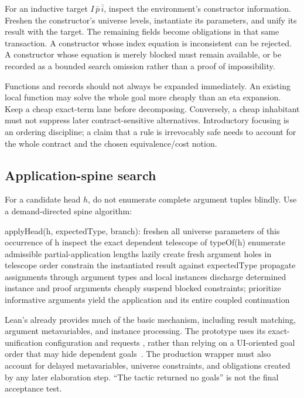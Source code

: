 For an inductive target $I\,\bar p\,\bar i$, inspect the environment's constructor
information. Freshen the constructor's universe levels, instantiate its
parameters, and unify its result with the target. The remaining fields become
obligations in that same transaction. A constructor whose index equation is
inconsistent can be rejected. A constructor whose equation is merely blocked
must remain available, or be recorded as a bounded search omission rather than
a proof of impossibility.

Functions and records should not always be expanded immediately. An existing
local function may solve the whole goal more cheaply than an eta expansion.
Keep a cheap exact-term lane before decomposing. Conversely, a cheap inhabitant
must not suppress later contract-sensitive alternatives. Introductory focusing
is an ordering discipline; a claim that a rule is irrevocably safe needs to
account for the whole contract and the chosen equivalence/cost notion.

\subsection{Application-spine search}\label{sec:spines}

For a candidate head $h$, do not enumerate complete argument tuples blindly.
Use a demand-directed spine algorithm:
\begin{Code}
applyHead(h, expectedType, branch):
  freshen all universe parameters of this occurrence of h
  inspect the exact dependent telescope of typeOf(h)
  enumerate admissible partial-application lengths lazily
  create fresh argument holes in telescope order
  constrain the instantiated result against expectedType
  propagate assignments through argument types and local instances
  discharge determined instance and proof arguments cheaply
  suspend blocked constraints; prioritize informative arguments
  yield the application and its entire coupled continuation
\end{Code}

Lean's  already provides much of the basic mechanism,
including result matching, argument metavariables, and instance processing.
The prototype uses its exact-unification configuration and requests
, rather than relying on a UI-oriented goal order that
may hide dependent goals~\cite{lean-apply}. The production wrapper must also
account for delayed metavariables, universe constraints, and obligations
created by any later elaboration step. ``The tactic returned no goals'' is not
the final acceptance test.

